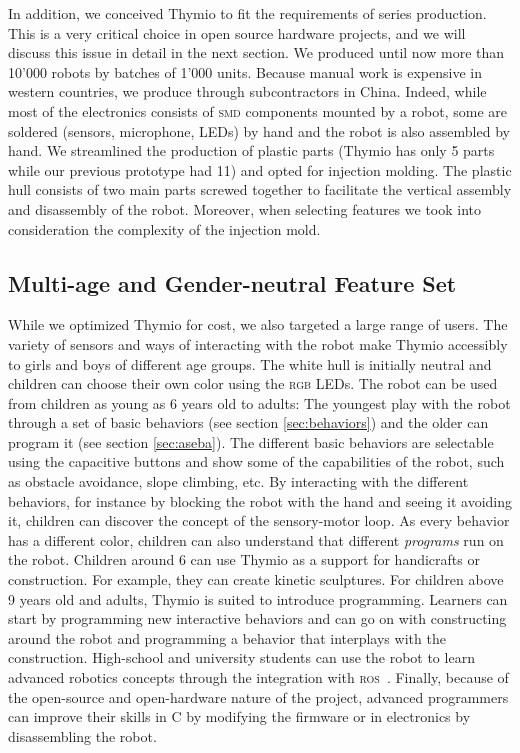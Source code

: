 \documentclass[letterpaper, 10 pt, conference]{ieeeconf}  %
\begin{document}
In addition, we conceived Thymio to fit the requirements of series production.
This is a very critical choice in open source hardware projects, and we will discuss this issue in detail in the next section.
We produced until now more than 10'000 robots by batches of 1'000 units.
Because manual work is expensive in western countries, we produce through subcontractors in China.
Indeed, while most of the electronics consists of \textsc{smd} components mounted by a robot, some are soldered (sensors, microphone, LEDs) by hand and the robot is also assembled by hand.
We streamlined the production of plastic parts (Thymio has only 5 parts while our previous prototype had 11) and opted for injection molding. 
The plastic hull consists of two main parts screwed together to facilitate the vertical assembly and disassembly of the robot.
Moreover, when selecting features we took into consideration the complexity of the injection mold.

\subsection{Multi-age and Gender-neutral Feature Set}

While we optimized Thymio for cost, we also targeted a large range of users.
The variety of sensors and ways of interacting with the robot make Thymio accessibly to girls and boys of different age groups.
The white hull is initially neutral and children can choose their own color using the \textsc{rgb} LEDs.
The robot can be used from children as young as 6 years old to adults:
The youngest play with the robot through a set of basic behaviors (see section \ref{sec:behaviors}) and the older can program it (see section \ref{sec:aseba}).
The different basic behaviors are selectable using the capacitive buttons and show some of the capabilities of the robot, such as obstacle avoidance, slope climbing, etc.
By interacting with the different behaviors, for instance by blocking the robot with the hand and seeing it avoiding it, children can discover the concept of the sensory-motor loop. 
As every behavior has a different color, children can also understand that different \emph{programs} run on the robot.
Children around 6 can use Thymio as a support for handicrafts or construction.
For example, they can create kinetic sculptures.
For children above 9 years old and adults, Thymio is suited to introduce programming.
Learners can start by programming new interactive behaviors and can go on with constructing around the robot and programming a behavior that interplays with the construction.
High-school and university students can use the robot to learn advanced robotics concepts through the integration with \textsc{ros}~\cite{quigley2009ros}.
Finally, because of the open-source and open-hardware nature of the project, advanced programmers can improve their skills in C by modifying the firmware or in electronics by disassembling the robot.
\end{document}
